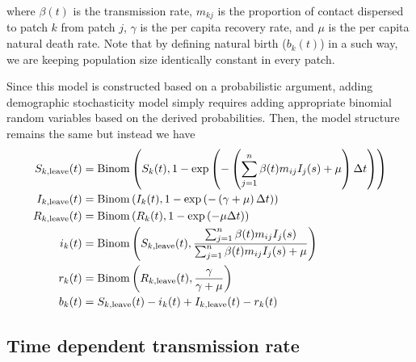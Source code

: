 \documentclass[12pt]{article}
\begin{document}
where $\beta(t)$ is the transmission rate, $m_{kj}$ is the proportion of contact dispersed to patch $k$ from patch $j$, $\gamma$ is the per capita recovery rate, and $\mu$ is the per capita natural death rate. 
Note that by defining natural birth ($b_k(t)$) in a such way, we are keeping population size identically constant in every patch.

Since this model is constructed based on a probabilistic argument, adding demographic stochasticity model simply requires adding appropriate binomial random variables based on the derived probabilities. Then, the model structure remains the same but instead we have
\begin{equation}
\begin{aligned}
S_{k, \tiny{\textrm{leave}}}(t) &= \mathrm{Binom}\left(S_k(t), 1 - \exp \left(-\left(\sum_{j=1}^n \beta(t) m_{ij} I_j(s) + \mu \right) \Delta t \right)\right)\\
I_{k, \tiny{\textrm{leave}}}(t) &= \mathrm{Binom}\left(I_k(t), 1 - \exp \left(-\left(\gamma + \mu \right) \Delta t \right)\right)\\
R_{k, \tiny{\textrm{leave}}}(t) &= \mathrm{Binom}\left(R_k(t), 1 - \exp \left(-\mu \Delta t \right)\right)\\
i_k(t) &= \mathrm{Binom}\left(S_{k, \tiny{\textrm{leave}}}(t), \frac{\sum_{j=1}^n \beta(t) m_{ij} I_j(s)}{\sum_{j=1}^n \beta(t) m_{ij} I_j(s) + \mu}\right)\\
r_k(t) &= \mathrm{Binom}\left(R_{k, \tiny{\textrm{leave}}}(t), \frac{\gamma}{\gamma + \mu}\right) \\
b_k(t) &= S_{k, \tiny{\textrm{leave}}}(t) - i_k(t) + I_{k, \tiny{\textrm{leave}}}(t) - r_k(t)\\
\end{aligned}
\end{equation}

\subsection{Time dependent transmission rate}
\end{document}
